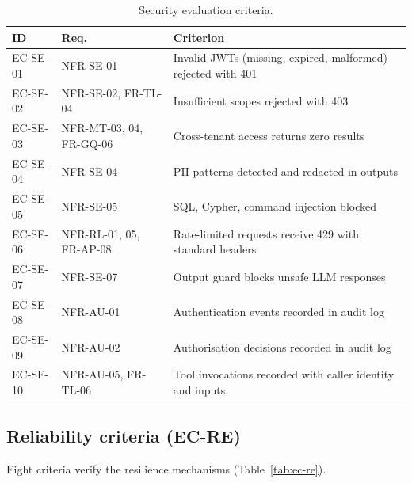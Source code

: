 \documentclass[a4paper]{sapthesis}
\begin{document}
\begin{table}[ht]
\centering
\caption{Security evaluation criteria.}
\label{tab:ec-se}
\small
\begin{tabularx}{\textwidth}{@{}l l X@{}}
    \hline
    \textbf{ID} & \textbf{Req.} & \textbf{Criterion} \\
    \hline
    EC-SE-01 & NFR-SE-01 & Invalid JWTs (missing, expired, malformed)
        rejected with 401 \\
    EC-SE-02 & NFR-SE-02, FR-TL-04 & Insufficient scopes rejected
        with 403 \\
    EC-SE-03 & NFR-MT-03, 04, FR-GQ-06 & Cross-tenant access returns
        zero results \\
    EC-SE-04 & NFR-SE-04 & PII patterns detected and redacted in
        outputs \\
    EC-SE-05 & NFR-SE-05 & SQL, Cypher, command injection blocked \\
    EC-SE-06 & NFR-RL-01, 05, FR-AP-08 & Rate-limited requests receive
        429 with standard headers \\
    EC-SE-07 & NFR-SE-07 & Output guard blocks unsafe LLM
        responses \\
    EC-SE-08 & NFR-AU-01 & Authentication events recorded in audit
        log \\
    EC-SE-09 & NFR-AU-02 & Authorisation decisions recorded in audit
        log \\
    EC-SE-10 & NFR-AU-05, FR-TL-06 & Tool invocations recorded with
        caller identity and inputs \\
    \hline
\end{tabularx}
\end{table}

\subsection{Reliability criteria (EC-RE)}

Eight criteria verify the resilience mechanisms
(Table~\ref{tab:ec-re}).
\end{document}
